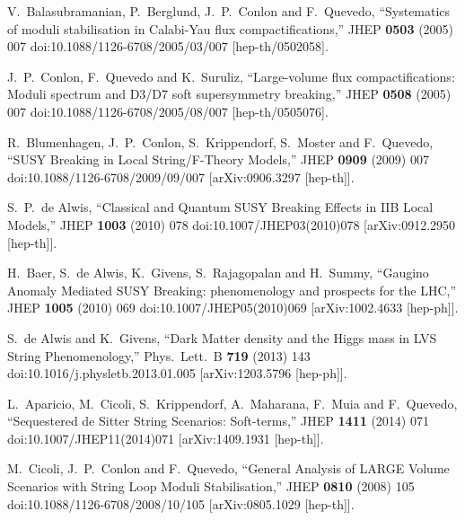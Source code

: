 \documentclass[11pt,a4paper]{article}
\begin{document}
\begin{thebibliography}{99}

  V.~Balasubramanian, P.~Berglund, J.~P.~Conlon and F.~Quevedo,
  ``Systematics of moduli stabilisation in Calabi-Yau flux compactifications,''
  JHEP {\bf 0503} (2005) 007
  doi:10.1088/1126-6708/2005/03/007
  [hep-th/0502058].
	
  J.~P.~Conlon, F.~Quevedo and K.~Suruliz,
  ``Large-volume flux compactifications: Moduli spectrum and D3/D7 soft supersymmetry breaking,''
  JHEP {\bf 0508} (2005) 007
  doi:10.1088/1126-6708/2005/08/007
  [hep-th/0505076].
	
  R.~Blumenhagen, J.~P.~Conlon, S.~Krippendorf, S.~Moster and F.~Quevedo,
  ``SUSY Breaking in Local String/F-Theory Models,''
  JHEP {\bf 0909} (2009) 007
  doi:10.1088/1126-6708/2009/09/007
  [arXiv:0906.3297 [hep-th]].
	
  S.~P.~de Alwis,
  ``Classical and Quantum SUSY Breaking Effects in IIB Local Models,''
  JHEP {\bf 1003} (2010) 078
  doi:10.1007/JHEP03(2010)078
  [arXiv:0912.2950 [hep-th]].
	
  H.~Baer, S.~de Alwis, K.~Givens, S.~Rajagopalan and H.~Summy,
  ``Gaugino Anomaly Mediated SUSY Breaking: phenomenology and prospects for the LHC,''
  JHEP {\bf 1005} (2010) 069
  doi:10.1007/JHEP05(2010)069
  [arXiv:1002.4633 [hep-ph]].
	
  S.~de Alwis and K.~Givens,
  ``Dark Matter density and the Higgs mass in LVS String Phenomenology,''
  Phys.\ Lett.\ B {\bf 719} (2013) 143
  doi:10.1016/j.physletb.2013.01.005
  [arXiv:1203.5796 [hep-ph]].
		
  L.~Aparicio, M.~Cicoli, S.~Krippendorf, A.~Maharana, F.~Muia and F.~Quevedo,
  ``Sequestered de Sitter String Scenarios: Soft-terms,''
  JHEP {\bf 1411} (2014) 071
  doi:10.1007/JHEP11(2014)071
  [arXiv:1409.1931 [hep-th]].
	
  M.~Cicoli, J.~P.~Conlon and F.~Quevedo,
  ``General Analysis of LARGE Volume Scenarios with String Loop Moduli Stabilisation,''
  JHEP {\bf 0810} (2008) 105
  doi:10.1088/1126-6708/2008/10/105
  [arXiv:0805.1029 [hep-th]].


\end{thebibliography}
\end{document}
